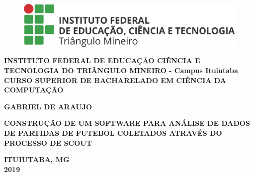 \thispagestyle{empty}

\begin{figure}
	\centering
	\includegraphics[scale=0.3]{imagens/ifHorizontal.png}
\end{figure}

\begin{center}
\textbf{INSTITUTO FEDERAL DE EDUCAÇÃO CIÊNCIA E TECNOLOGIA DO TRIÂNGULO MINEIRO - Campus Ituiutaba\\CURSO SUPERIOR DE BACHARELADO EM CIÊNCIA DA COMPUTAÇÃO}\\

\vspace*{2 cm}

\textbf{GABRIEL DE ARAUJO}\\

\vspace*{5 cm}

\textbf{\large{CONSTRUÇÃO DE UM SOFTWARE PARA ANÁLISE DE DADOS DE PARTIDAS DE FUTEBOL COLETADOS ATRAVÉS DO PROCESSO DE SCOUT}}

\vspace*{8 cm}

\textbf{ITUIUTABA, MG\\2019}
\end{center}